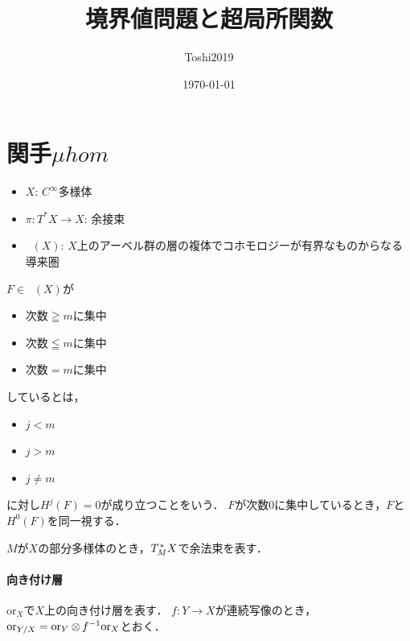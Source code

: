\documentclass[leqno, 10pt, a4paper, dvipdfmx]{jsarticle}
\title{境界値問題と超局所関数}
\author{Toshi2019}
\date{\today}
\theoremstyle{definition}
\numberwithin{equation}{section}
\newcommand{\Dompb}{\mathop{\mathsf{D}^\mathrm{b}}\nolimits}
\newcommand{\ori}{\mathord{\mathrm{or}}}
\newcommand{\tens}[1][]{\mathbin{\otimes_{\raise1.5ex\hbox to-.1em{}{#1}}}}
\theoremstyle{mystyle}
\newcommand{\cotb}[1][]{T^{\ast}{#1}}
\newcommand{\conm}[2][]{T_{#1}^{\hspace{0.7pt}\ast}{#2}}
\newcommand{\muhom}{\mu hom}
\begin{document}
\maketitle

\section{関手\(\muhom\) {\cite{Sch88}}}
\begin{itemize}
    \item \(X\): \(C^\infty\)多様体
    \item \(\pi\colon \cotb[X]\to X\): 余接束
    \item \(\Dompb(X)\): \(X\)上のアーベル群の層の複体でコホモロジーが有界なものからなる導来圏
\end{itemize}

\(F\in\Dompb(X)\)が
\begin{itemize}
    \item 次数\(\geqq m\)に集中
    \item 次数\(\leqq m\)に集中
    \item 次数\(= m\)に集中
\end{itemize}しているとは，
\begin{itemize}
    \item \(j<m\)
    \item \(j>m\)
    \item \(j\ne m\)
\end{itemize}
に対し\(H^{j}(F)=0\)が成り立つことをいう．
\(F\)が次数\(0\)に集中しているとき，\(F\)と\(H^0(F)\)を同一視する．

\(M\)が\(X\)の部分多様体のとき，\(\conm[M]{X}\)で余法束を表す．

\paragraph{向き付け層}
\(\ori_X\)で\(X\)上の向き付け層を表す．
\(f\colon Y\to X\)が連続写像のとき，
\(\ori_{Y/X}=\ori_Y\tens[]f^{-1}\ori_X\)とおく．
\end{document}
